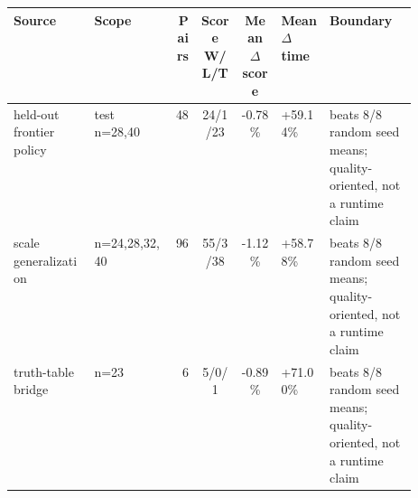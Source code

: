 \begin{tabularx}{\linewidth}{>{\raggedright\arraybackslash}p{0.20\linewidth}>{\raggedright\arraybackslash}p{0.20\linewidth}rcc>{\raggedleft\arraybackslash}p{0.12\linewidth}>{\raggedright\arraybackslash}X}
\toprule
Source & Scope & Pairs & Score W/L/T & Mean $\Delta$ score & Mean $\Delta$ time & Boundary \\
\midrule
held-out frontier policy & test n=28,40 & 48 & 24/1/23 & -0.78\% & +59.14\% & beats 8/8 random seed means; quality-oriented, not a runtime claim \\
scale generalization & n=24,28,32,40 & 96 & 55/3/38 & -1.12\% & +58.78\% & beats 8/8 random seed means; quality-oriented, not a runtime claim \\
truth-table bridge & n=23 & 6 & 5/0/1 & -0.89\% & +71.00\% & beats 8/8 random seed means; quality-oriented, not a runtime claim \\
\bottomrule
\end{tabularx}
